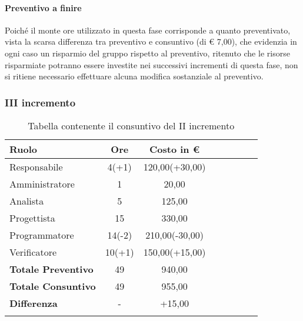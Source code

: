 \paragraph{Preventivo a finire}
Poiché il monte ore utilizzato in questa fase corrisponde a quanto preventivato, vista la scarsa differenza tra preventivo e consuntivo (di € 7,00), che evidenzia in ogni caso un risparmio del gruppo rispetto al preventivo, ritenuto che le risorse risparmiate potranno essere investite nei successivi incrementi di questa fase, non si ritiene necessario effettuare alcuna modifica sostanziale al preventivo.

\subsubsection{III incremento}\label{_consuntivoPoC3}
\begin{longtable}{|l|c|c|c|c|c|c|c|}
	\hline
	\rowcolor{lighter-grayer}
	\textbf{Ruolo}             & \textbf{Ore} & \textbf{Costo in €} \\
	\hline
	\endfirsthead

	\hline
	Responsabile               & 4(+1)           & 120,00(+30,00)              \\
	\hline
	\hline
	Amministratore             & 1       & 20,00      \\
	\hline
	\hline
	Analista                   & 5       & 125,00   \\
	\hline
	\hline
	Progettista                & 15            & 330,00              \\
	\hline
	\hline
	Programmatore              & 14(-2)            & 210,00(-30,00)                   \\
	\hline
	\hline
	Verificatore               & 10(+1)       & 150,00(+15,00)    \\
	\hline
	\textbf{Totale Preventivo} & 49          & 940,00            \\
	\hline
	\hline
	\textbf{Totale Consuntivo} & 49          & 955,00            \\
	\hline
	\hline
	\textbf{Differenza}        & -           & +15,00           \\
	\hline
	\rowcolor{white}
	\caption{Tabella contenente il consuntivo del II incremento}
\end{longtable}
